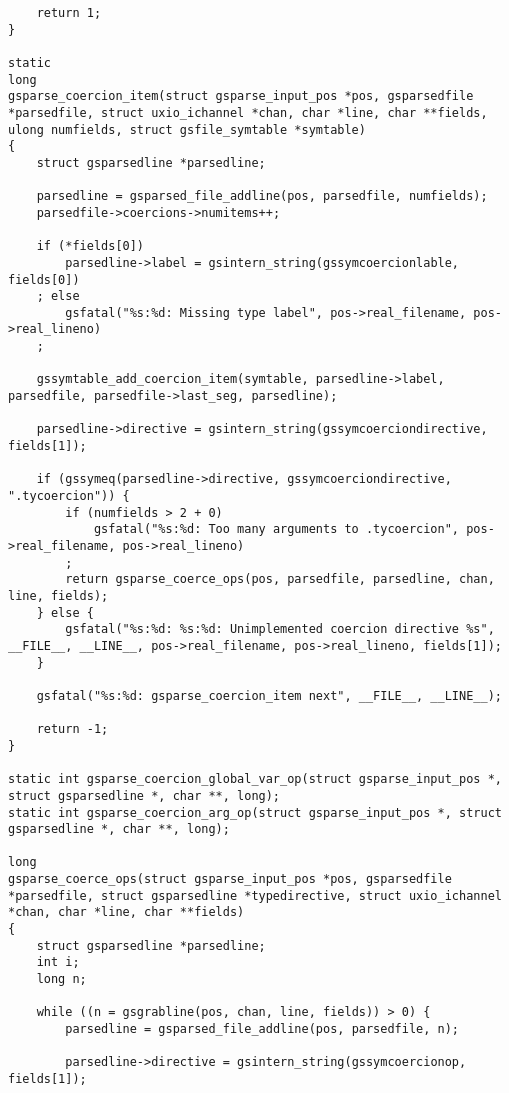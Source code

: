 \documentclass{report}
\begin{document}
\begin{verbatim}
    return 1;
}

static
long
gsparse_coercion_item(struct gsparse_input_pos *pos, gsparsedfile *parsedfile, struct uxio_ichannel *chan, char *line, char **fields, ulong numfields, struct gsfile_symtable *symtable)
{
    struct gsparsedline *parsedline;

    parsedline = gsparsed_file_addline(pos, parsedfile, numfields);
    parsedfile->coercions->numitems++;

    if (*fields[0])
        parsedline->label = gsintern_string(gssymcoercionlable, fields[0])
    ; else
        gsfatal("%s:%d: Missing type label", pos->real_filename, pos->real_lineno)
    ;

    gssymtable_add_coercion_item(symtable, parsedline->label, parsedfile, parsedfile->last_seg, parsedline);

    parsedline->directive = gsintern_string(gssymcoerciondirective, fields[1]);

    if (gssymeq(parsedline->directive, gssymcoerciondirective, ".tycoercion")) {
        if (numfields > 2 + 0)
            gsfatal("%s:%d: Too many arguments to .tycoercion", pos->real_filename, pos->real_lineno)
        ;
        return gsparse_coerce_ops(pos, parsedfile, parsedline, chan, line, fields);
    } else {
        gsfatal("%s:%d: %s:%d: Unimplemented coercion directive %s", __FILE__, __LINE__, pos->real_filename, pos->real_lineno, fields[1]);
    }

    gsfatal("%s:%d: gsparse_coercion_item next", __FILE__, __LINE__);

    return -1;
}

static int gsparse_coercion_global_var_op(struct gsparse_input_pos *, struct gsparsedline *, char **, long);
static int gsparse_coercion_arg_op(struct gsparse_input_pos *, struct gsparsedline *, char **, long);

long
gsparse_coerce_ops(struct gsparse_input_pos *pos, gsparsedfile *parsedfile, struct gsparsedline *typedirective, struct uxio_ichannel *chan, char *line, char **fields)
{
    struct gsparsedline *parsedline;
    int i;
    long n;

    while ((n = gsgrabline(pos, chan, line, fields)) > 0) {
        parsedline = gsparsed_file_addline(pos, parsedfile, n);

        parsedline->directive = gsintern_string(gssymcoercionop, fields[1]);


\end{verbatim}
\end{document}
